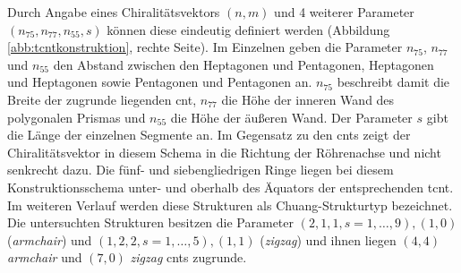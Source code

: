 Durch Angabe eines Chiralitätsvektors $(n,m)$ und 4 weiterer Parameter $(n_{75},n_{77},n_{55},s)$ können diese eindeutig definiert werden (Abbildung \ref{abb:tcntkonstruktion}, rechte Seite). Im Einzelnen geben die Parameter $n_{75}$, $n_{77}$ und $n_{55}$ den Abstand zwischen den Heptagonen und Pentagonen, Heptagonen und Heptagonen sowie Pentagonen und Pentagonen an. $n_{75}$ beschreibt damit die Breite der zugrunde liegenden \ac{cnt}, $n_{77}$ die Höhe der inneren Wand des polygonalen Prismas und $n_{55}$ die Höhe der äußeren Wand. Der Parameter $s$ gibt die Länge der einzelnen Segmente an. Im Gegensatz zu den \acp{cnt} zeigt der Chiralitätsvektor in diesem Schema in die Richtung der Röhrenachse und nicht senkrecht dazu. Die fünf- und siebengliedrigen Ringe liegen bei diesem Konstruktionsschema unter- und oberhalb des Äquators der entsprechenden \ac{tcnt}. Im weiteren Verlauf werden diese Strukturen als \glqq Chuang-Strukturtyp\grqq{} bezeichnet. Die untersuchten Strukturen besitzen die Parameter $(2,1,1,s=1,\dots,9),(1,0)$ (\textit{armchair}) und $(1,2,2,s=1,\dots,5),(1,1)$ (\textit{zigzag}) und ihnen liegen $(4,4)$ \textit{armchair} und $(7,0)$ \textit{zigzag} \acp{cnt} zugrunde.\\

